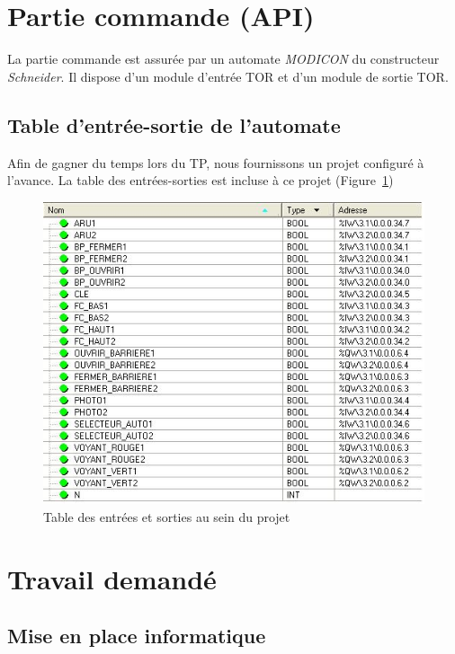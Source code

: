 \documentclass[11pt, multicol]{article}
\begin{document}
\section{Partie commande (API)}
La partie commande est assurée par un automate \textit{MODICON} du constructeur \textit{Schneider}. Il dispose d'un module d'entrée TOR et d'un module de sortie TOR.

\subsection{Table d'entrée-sortie de l'automate}
Afin de gagner du temps lors du TP, nous fournissons un projet configuré à l'avance. La table des entrées-sorties est incluse à ce projet (Figure~\ref{fig:entreesSorties})
\begin{figure}[h]
	\centering
	\includegraphics[width=.9\textwidth]{images/listeES}
	\caption{Table des entrées et sorties au sein du projet}
	\label{fig:entreesSorties}
\end{figure}
\pagebreak
\section{Travail demandé}
\subsection{Mise en place informatique}

\end{document}
